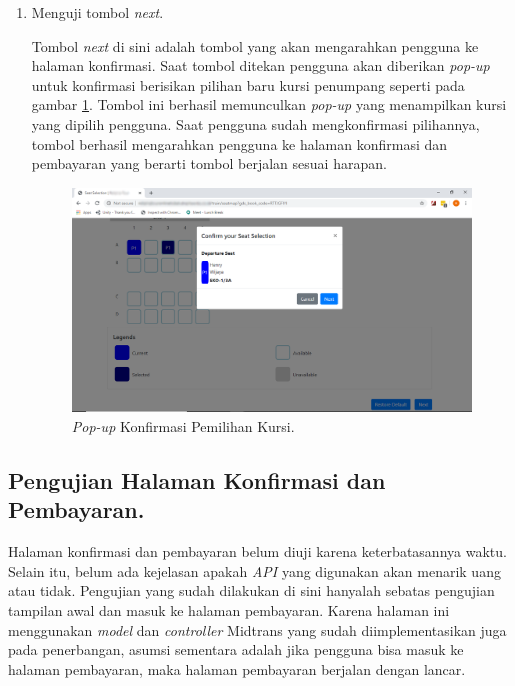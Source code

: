 \begin{enumerate}
        \item Menguji tombol \textit{next}.
        
        Tombol \textit{next} di sini adalah tombol yang akan mengarahkan pengguna ke halaman konfirmasi. Saat tombol ditekan pengguna akan diberikan \textit{pop-up} untuk konfirmasi berisikan pilihan baru kursi penumpang seperti pada gambar \ref{img:konfirmasikursi}. Tombol ini berhasil memunculkan \textit{pop-up} yang menampilkan kursi yang dipilih pengguna. Saat pengguna sudah mengkonfirmasi pilihannya, tombol berhasil mengarahkan pengguna ke halaman konfirmasi dan pembayaran yang berarti tombol berjalan sesuai harapan.
        
        \begin{figure}[H]
        \center
        \includegraphics[width=\textwidth,height=\textheight,keepaspectratio]{Gambar/Konfirmasi pilih kursi.png}
        \caption{\textit{Pop-up} Konfirmasi Pemilihan Kursi.}
            \label{img:konfirmasikursi}
        \end{figure}
        
    \end{enumerate}
    
\subsection{Pengujian Halaman Konfirmasi dan Pembayaran.}
\label{subsec:pengujiankonfirmasi}

Halaman konfirmasi dan pembayaran belum diuji karena keterbatasannya waktu. Selain itu, belum ada kejelasan apakah \textit{API} yang digunakan akan menarik uang atau tidak. Pengujian yang sudah dilakukan di sini hanyalah sebatas pengujian tampilan awal dan masuk ke halaman pembayaran. Karena halaman ini menggunakan \textit{model} dan \textit{controller} Midtrans yang sudah diimplementasikan juga pada penerbangan, asumsi sementara adalah jika pengguna bisa masuk ke halaman pembayaran, maka halaman pembayaran berjalan dengan lancar.

